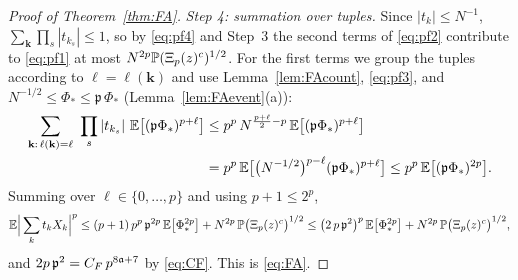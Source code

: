 \begin{proof}[Proof of Theorem~\ref{thm:FA}]
\emph{Step 4: summation over tuples.} Since $|t_k|\le N^{-1}$, $\sum_{\mathbf k}\prod_s|t_{k_s}|\le1$, so by \eqref{eq:pf4} and Step~3 the second terms of \eqref{eq:pf2} contribute to \eqref{eq:pf1} at most $N^{2p}\mathbb{P}(\Xi_p(z)^c)^{1/2}$.
For the first terms we group the tuples according to $\ell=\ell(\mathbf k)$ and use Lemma~\ref{lem:FAcount}, \eqref{eq:pf3}, and $N^{-1/2}\le\Phi_*\le\mathfrak p\,\Phi_*$ (Lemma~\ref{lem:FAevent}(a)):
\begin{align*}
 \sum_{\mathbf k:\,\ell(\mathbf k)=\ell}\ \prod_s|t_{k_s}|\ \EE\big[(\mathfrak p\Phi_*)^{p+\ell}\big]&\le p^p\,N^{\frac{p+\ell}2-p}\,\EE\big[(\mathfrak p\Phi_*)^{p+\ell}\big]\\
 &=p^p\,\EE\big[\big(N^{-1/2}\big)^{p-\ell}(\mathfrak p\Phi_*)^{p+\ell}\big]\le p^p\,\EE\big[(\mathfrak p\Phi_*)^{2p}\big].
\end{align*}
Summing over $\ell\in\{0,\dots,p\}$ and using $p+1\le2^p$,
\[
 \mathbb{E}\Big|\sum_kt_kX_k\Big|^p\le(p+1)\,p^p\,\mathfrak p^{2p}\,\mathbb{E}\big[\Phi_*^{2p}\big]+N^{2p}\,\mathbb{P}\big(\Xi_p(z)^c\big)^{1/2}\le\big(2\,p\,\mathfrak p^2\big)^p\,\mathbb{E}\big[\Phi_*^{2p}\big]+N^{2p}\,\mathbb{P}\big(\Xi_p(z)^c\big)^{1/2},
\]
and $2p\,\mathfrak p^2=C_F\,p^{8\mathfrak{a}+7}$ by \eqref{eq:CF}. This is \eqref{eq:FA}.
\end{proof}

